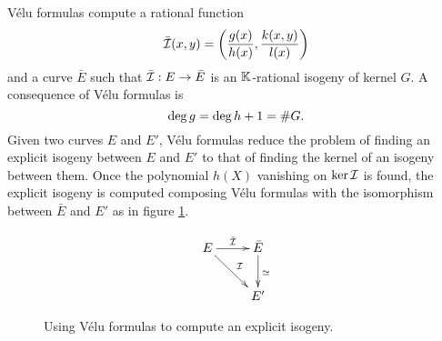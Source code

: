  Vélu formulas compute a rational function
\begin{equation}
  \label{eq:isog}
  \bar{\mathcal{I}}(x,y) = \left(\frac{g(x)}{h(x)}, \frac{k(x,y)}{l(x)}\right)  
\end{equation}
and a curve $\bar{E}$ such that $\bar{\mathcal{I}} : E\rightarrow\bar{E}$ is an
$\mathbb{K}$-rational isogeny of kernel $G$. A consequence of Vélu formulas
is
\begin{equation}
  \label{eq:velu-deg}
  \deg g = \deg h + 1 = \# G
  \text{.}
\end{equation}
Given two curves $E$ and $E'$, Vélu formulas reduce the problem of
finding an explicit isogeny between $E$ and $E'$ to that of finding
the kernel of an isogeny between them. Once the polynomial $h(X)$
vanishing on $\ker\mathcal{I}$ is found, the explicit isogeny is computed
composing Vélu formulas with the isomorphism between $\bar{E}$ and
$E'$ as in figure \ref{fig:velu}.

\begin{figure}
  \centering
  \[\xymatrix{
    E \ar[r]^{\bar{\I}} \ar[rd]^\I & \bar{E} \ar[d]^{\simeq}\\
    & E'
  }\]
  \caption{Using Vélu formulas to compute an explicit isogeny.}
  \label{fig:velu}
\end{figure}




%
